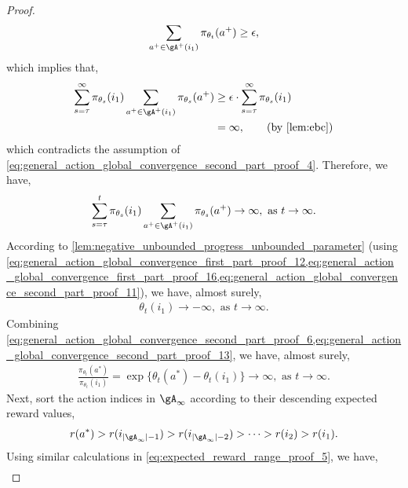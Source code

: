 \begin{proof}
\begin{align}
\label{eq:general_action_global_convergence_second_part_proof_10}
    \sum_{a^+ \in \gA^+(i_1)}{ \pi_{\theta_t}(a^+) } \ge \epsilon,
\end{align}
which implies that,
\begin{align}
\label{eq:general_action_global_convergence_second_part_proof_11}
    \sum_{s=\tau}^{\infty} \pi_{\theta_s}(i_1) \sum_{a^+ \in \gA^+(i_1)}{ \pi_{\theta_s}(a^+) } &\ge \epsilon \cdot \sum_{s=\tau}^{\infty} \pi_{\theta_s}(i_1) \\
    &= \infty, \qquad \left( \text{by \cref{lem:ebc}} \right)
\end{align}
which contradicts the assumption of \cref{eq:general_action_global_convergence_second_part_proof_4}. Therefore, we have,
\begin{align}
\label{eq:general_action_global_convergence_second_part_proof_12}
    \sum_{s=\tau}^t \pi_{\theta_s}(i_1) \sum_{a^+ \in \gA^+(i_1)}{ \pi_{\theta_s}(a^+) } \to \infty, \text{ as } t \to \infty.
\end{align}
According to \cref{lem:negative_unbounded_progress_unbounded_parameter} (using \cref{eq:general_action_global_convergence_first_part_proof_12,eq:general_action_global_convergence_first_part_proof_16,eq:general_action_global_convergence_second_part_proof_11}), we have, almost surely, 
\begin{align}
\label{eq:general_action_global_convergence_second_part_proof_13}
    \theta_t(i_1) \to  - \infty, \text{ as } t \to \infty.
\end{align}
Combining \cref{eq:general_action_global_convergence_second_part_proof_6,eq:general_action_global_convergence_second_part_proof_13}, we have, almost surely,
\begin{align}
\label{eq:general_action_global_convergence_second_part_proof_14}
    \frac{ \pi_{\theta_t}(a^*) }{ \pi_{\theta_t}(i_1)} = \exp\{ \theta_t(a^*) - \theta_t(i_1) \} \to \infty, \text{ as } t \to \infty.
\end{align}
Next, sort the action indices in $\gA_\infty$ according to their descending expected reward values,
\begin{align}
\label{eq:general_action_global_convergence_second_part_proof_15}
    r(a^*) > r(i_{|\gA_\infty| - 1}) > r(i_{|\gA_\infty| - 2}) > \cdots > r(i_2) > r(i_1).
\end{align}
Using similar calculations in \cref{eq:expected_reward_range_proof_5}, we have,
\begin{align}
\label{eq:general_action_global_convergence_second_part_proof_16}

\end{align}
\end{proof}
